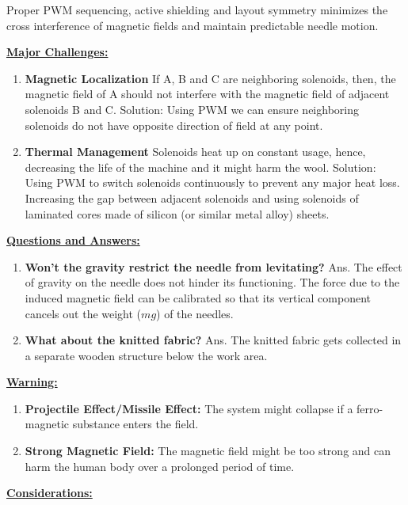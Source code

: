 \documentclass[10pt]{article}
\newcommand{\sectionlabel}[1]{\par\textbf{\underline{#1}}\par}
\begin{document}
Proper PWM sequencing, active shielding and layout symmetry minimizes the cross interference of magnetic fields and maintain predictable needle motion.

\sectionlabel{Major Challenges:}

\begin{enumerate}
  \item \textbf{Magnetic Localization} If A, B and C are neighboring solenoids, then, the magnetic field of A should not interfere with the magnetic field of adjacent solenoids B and C. Solution: Using PWM we can ensure neighboring solenoids do not have opposite direction of field at any point.
  \item \textbf{Thermal Management} Solenoids heat up on constant usage, hence, decreasing the life of the machine and it might harm the wool. Solution: Using PWM to switch solenoids continuously to prevent any major heat loss. Increasing the gap between adjacent solenoids and using solenoids of laminated cores made of silicon (or similar metal alloy) sheets.
\end{enumerate}

\sectionlabel{Questions and Answers:}

\begin{enumerate}
  \item \textbf{Won't the gravity restrict the needle from levitating?} Ans. The effect of gravity on the needle does not hinder its functioning. The force due to the induced magnetic field can be calibrated so that its vertical component cancels out the weight ($mg$) of the needles.
  \item \textbf{What about the knitted fabric?} Ans. The knitted fabric gets collected in a separate wooden structure below the work area.
\end{enumerate}

\sectionlabel{Warning:}

\begin{enumerate}
  \item \textbf{Projectile Effect/Missile Effect:} The system might collapse if a ferro-magnetic substance enters the field.
  \item \textbf{Strong Magnetic Field:} The magnetic field might be too strong and can harm the human body over a prolonged period of time.
\end{enumerate}

\sectionlabel{Considerations:}
\end{document}
